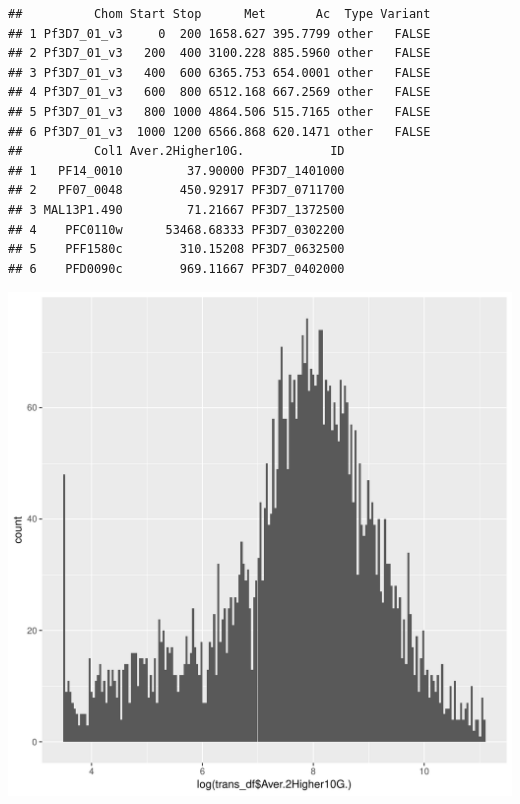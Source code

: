 \documentclass{article}\usepackage[]{graphicx}\usepackage[]{color}
\makeatletter
\def\maxwidth{ %
  \ifdim\Gin@nat@width>\linewidth
    \linewidth
  \else
    \Gin@nat@width
  \fi
}
\newenvironment{kframe}{%
 \def\at@end@of@kframe{}%
 \ifinner\ifhmode%
  \def\at@end@of@kframe{\end{minipage}}%
  \begin{minipage}{\columnwidth}%
 \fi\fi%
 \def\FrameCommand##1{\hskip\@totalleftmargin \hskip-\fboxsep
 \colorbox{shadecolor}{##1}\hskip-\fboxsep
     \hskip-\linewidth \hskip-\@totalleftmargin \hskip\columnwidth}%
 \MakeFramed {\advance\hsize-\width
   \@totalleftmargin\z@ \linewidth\hsize
   \@setminipage}}%
 {\par\unskip\endMakeFramed%
 \at@end@of@kframe}
\newenvironment{knitrout}{}{} %
\makeatother
\begin{document}
\begin{knitrout}
\color{fgcolor}\begin{kframe}
\begin{verbatim}
##          Chom Start Stop      Met       Ac  Type Variant
## 1 Pf3D7_01_v3     0  200 1658.627 395.7799 other   FALSE
## 2 Pf3D7_01_v3   200  400 3100.228 885.5960 other   FALSE
## 3 Pf3D7_01_v3   400  600 6365.753 654.0001 other   FALSE
## 4 Pf3D7_01_v3   600  800 6512.168 667.2569 other   FALSE
## 5 Pf3D7_01_v3   800 1000 4864.506 515.7165 other   FALSE
## 6 Pf3D7_01_v3  1000 1200 6566.868 620.1471 other   FALSE
##          Col1 Aver.2Higher10G.            ID
## 1   PF14_0010         37.90000 PF3D7_1401000
## 2   PF07_0048        450.92917 PF3D7_0711700
## 3 MAL13P1.490         71.21667 PF3D7_1372500
## 4    PFC0110w      53468.68333 PF3D7_0302200
## 5    PFF1580c        310.15208 PF3D7_0632500
## 6    PFD0090c        969.11667 PF3D7_0402000
\end{verbatim}
\end{kframe}
\includegraphics[width=\maxwidth]{figure/import_status_data-1} 


\end{knitrout}
\end{document}
